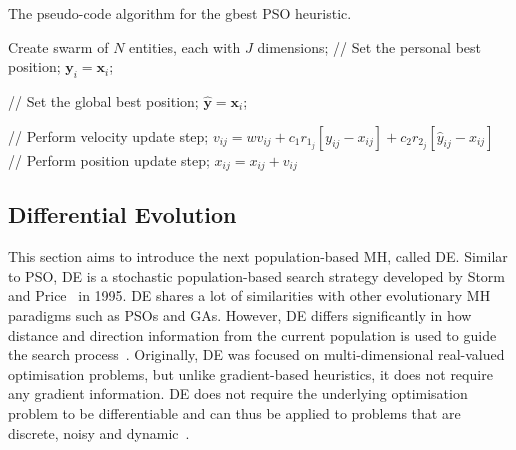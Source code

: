 \begin{algorithm}[htb]
      \caption{The pseudo-code algorithm for the gbest \acs{PSO} heuristic.}
      \label{algo:heuristics:pso:gbest}
      \begin{algorithmic}
            \State Create swarm of $N$ entities, each with $J$ dimensions;
            \State // Set the personal best position;
            \State $\boldsymbol{y}_{i} = \boldsymbol{x}_{i}$;
            \EndIf

            \State // Set the global best position;
            \State $\boldsymbol{\hat{y}} = \boldsymbol{x}_{i}$;
            \EndIf
            \EndFor

            \State // Perform velocity update step;
            \State $v_{ij} = wv_{ij} + c_{1}r_{1_{j}}[y_{ij} - x_{ij}] + c_{2}r_{2_{j}}[\hat{y}_{ij} - x_{ij}]$
            \State // Perform position update step;
            \State $x_{ij} = x_{ij} + v_{ij}$
            \EndFor
            \EndFor
            \EndWhile
      \end{algorithmic}
\end{algorithm}

\subsection{Differential Evolution}\label{sec:heuristics:mh:de}

This section aims to introduce the next population-based \acs{MH}, called \acf{DE}. Similar to \acs{PSO}, \acs{DE} is a stochastic population-based search strategy developed by Storm and Price~\cite{ref:price:2006} in 1995. \Ac{DE} shares a lot of similarities with other evolutionary \acs{MH} paradigms such as \acp{PSO} and \acp{GA}. However, \acs{DE} differs significantly in how distance and direction information from the current population is used to guide the search process~\cite{ref:engelbrecht:2007}. Originally, \acs{DE} was focused on multi-dimensional real-valued optimisation problems, but unlike gradient-based heuristics, it does not require any gradient information. \acs{DE} does not require the underlying optimisation problem to be differentiable and can thus be applied to problems that are discrete, noisy and dynamic~\cite{ref:rocca:2011}.

